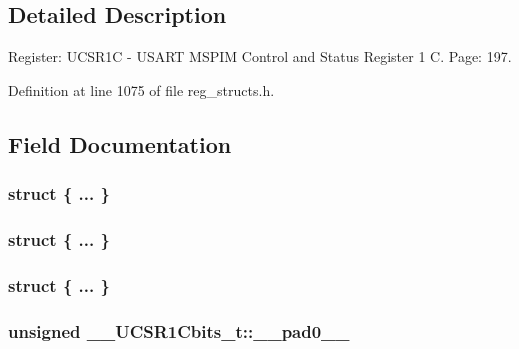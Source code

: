 \subsection{Detailed Description}
Register\+: U\+C\+S\+R1\+C -\/ U\+S\+A\+R\+T M\+S\+P\+I\+M Control and Status Register 1 C. Page\+: 197. 

Definition at line 1075 of file reg\+\_\+structs.\+h.



\subsection{Field Documentation}
\hypertarget{union_____u_c_s_r1_cbits__t_a11c4babe726ae9099b57a1c2810b52f2}{\subsubsection[{"@259}]{\setlength{\rightskip}{0pt plus 5cm}struct \{ ... \} }}\label{union_____u_c_s_r1_cbits__t_a11c4babe726ae9099b57a1c2810b52f2}
\hypertarget{union_____u_c_s_r1_cbits__t_a1bf3ce94e18fecd7a0813a878b37e1a2}{\subsubsection[{"@261}]{\setlength{\rightskip}{0pt plus 5cm}struct \{ ... \} }}\label{union_____u_c_s_r1_cbits__t_a1bf3ce94e18fecd7a0813a878b37e1a2}
\hypertarget{union_____u_c_s_r1_cbits__t_a67cebbd513a3d65053507fcb4179d4b8}{\subsubsection[{"@263}]{\setlength{\rightskip}{0pt plus 5cm}struct \{ ... \} }}\label{union_____u_c_s_r1_cbits__t_a67cebbd513a3d65053507fcb4179d4b8}
\hypertarget{union_____u_c_s_r1_cbits__t_aaa78efb82f1a89bf90227dbb14caff89}{
\subsubsection[{\+\_\+\+\_\+pad0\+\_\+\+\_\+}]{\setlength{\rightskip}{0pt plus 5cm}unsigned \+\_\+\+\_\+\+U\+C\+S\+R1\+Cbits\+\_\+t\+::\+\_\+\+\_\+pad0\+\_\+\+\_\+}}\label{union_____u_c_s_r1_cbits__t_aaa78efb82f1a89bf90227dbb14caff89}


